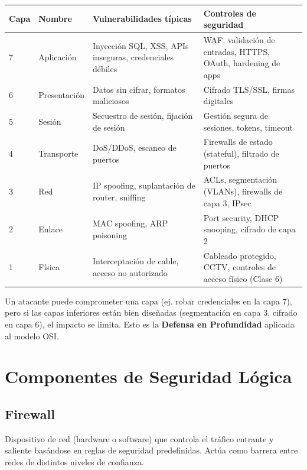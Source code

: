 \documentclass[11pt,a4paper]{article}
\begin{document}
\begin{center}
\renewcommand{\arraystretch}{1.4}
\begin{tabularx}{\textwidth}{@{} p{1.5cm} p{2.5cm} X X @{}}
\toprule
\textbf{Capa} & \textbf{Nombre} & \textbf{Vulnerabilidades típicas} & \textbf{Controles de seguridad} \\
\midrule
7 & Aplicación & Inyección SQL, XSS, APIs inseguras, credenciales débiles & WAF, validación de entradas, HTTPS, OAuth, hardening de apps \\
\midrule
6 & Presentación & Datos sin cifrar, formatos maliciosos & Cifrado TLS/SSL, firmas digitales \\
\midrule
5 & Sesión & Secuestro de sesión, fijación de sesión & Gestión segura de sesiones, tokens, timeout \\
\midrule
4 & Transporte & DoS/DDoS, escaneo de puertos & Firewalls de estado (stateful), filtrado de puertos \\
\midrule
3 & Red & IP spoofing, suplantación de router, sniffing & ACLs, segmentación (VLANs), firewalls de capa 3, IPsec \\
\midrule
2 & Enlace & MAC spoofing, ARP poisoning & Port security, DHCP snooping, cifrado de capa 2 \\
\midrule
1 & Física & Interceptación de cable, acceso no autorizado & Cableado protegido, CCTV, controles de acceso físico (Clase 6) \\
\bottomrule
\end{tabularx}
\end{center}

\begin{reflexion}
Un atacante puede comprometer una capa (ej. robar credenciales en la capa 7), pero si las capas inferiores están bien diseñadas (segmentación en capa 3, cifrado en capa 6), el impacto se limita. Esto es la \textbf{Defensa en Profundidad} aplicada al modelo OSI.
\end{reflexion}

\section{Componentes de Seguridad Lógica}

\subsection{Firewall}
\begin{definicion}[Firewall]
Dispositivo de red (hardware o software) que controla el tráfico entrante y saliente basándose en reglas de seguridad predefinidas. Actúa como barrera entre redes de distintos niveles de confianza.
\end{definicion}
\end{document}
